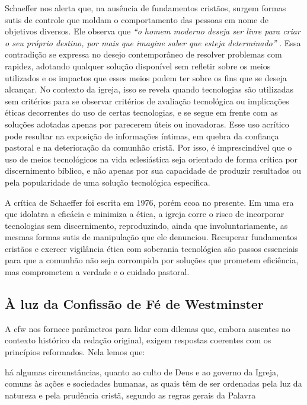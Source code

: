 Schaeffer nos alerta que, na ausência de fundamentos cristãos, surgem formas sutis de controle que moldam o comportamento das pessoas em nome de objetivos diversos. Ele observa que \textit{``o homem moderno deseja ser livre para criar o seu próprio destino, por mais que imagine saber que esteja determinado''} \cite[p.~169]{schaeffer2002}. Essa contradição se expressa no desejo contemporâneo de resolver problemas com rapidez, adotando qualquer solução disponível sem refletir sobre os meios utilizados e os impactos que esses meios podem ter sobre os fins que se deseja alcançar. No contexto da igreja, isso se revela quando tecnologias são utilizadas sem critérios para se observar critérios de avaliação tecnológica ou implicações éticas decorrentes do uso de certas tecnologias, e se segue em frente com as soluções adotadas apenas por parecerem úteis ou inovadoras. Esse uso acrítico pode resultar na exposição de informações íntimas, em quebra da confiança pastoral e na deterioração da comunhão cristã. Por isso, é imprescindível que o uso de meios tecnológicos na vida eclesiástica seja orientado de forma crítica por discernimento bíblico, e não apenas por sua capacidade de produzir resultados ou pela popularidade de uma solução tecnológica específica.

A crítica de Schaeffer foi escrita em 1976, porém ecoa no presente. Em uma era que idolatra a eficácia e minimiza a ética, a igreja corre o risco de incorporar tecnologias sem discernimento, reproduzindo, ainda que involuntariamente, as mesmas formas sutis de manipulação que ele denunciou. Recuperar fundamentos cristãos e exercer vigilância ética com soberania tecnológica são passos essenciais para que a comunhão não seja corrompida por soluções que prometem eficiência, mas comprometem a verdade e o cuidado pastoral.

\subsection{À luz da Confissão de Fé de Westminster}

A \gls{cfw} nos fornece parâmetros para lidar com dilemas que, embora ausentes no contexto histórico da redação original, exigem respostas coerentes com os princípios reformados. Nela lemos que:

\begin{citacao}
    há algumas circunstâncias, quanto ao culto de Deus e ao governo da Igreja, comuns às ações e sociedades humanas, as quais têm de ser ordenadas pela luz da natureza e pela prudência cristã, segundo as regras gerais da Palavra \cite[Cap.~I, §~VI]{cfw}    
\end{citacao}

